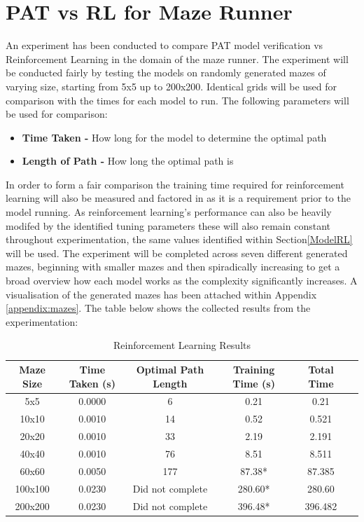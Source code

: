 \documentclass[twoside, 12pt, a4paper]{article}
\begin{document}
\section{PAT vs RL for Maze Runner}
An experiment has been conducted to compare PAT model verification vs Reinforcement Learning in the domain of the maze runner. The experiment will be conducted fairly by testing the models on randomly generated mazes of varying size, starting from 5x5 up to 200x200. Identical grids will be used for comparison with the times for each model to run. The following parameters will be used for comparison:
\begin {itemize}
\item \textbf{Time Taken -} How long for the model to determine the optimal path
\item \textbf{Length of Path -} How long the optimal path is
\end {itemize}
In order to form a fair comparison the training time required for reinforcement learning will also be measured and factored in as it is a requirement prior to the model running. As reinforcement learning's performance can also be heavily modifed by the identified tuning parameters these will also remain constant throughout experimentation, the same values identified within Section\ref{ModelRL} will be used.  The experiment will be completed across seven different generated mazes, beginning with smaller mazes and then spiradically increasing to get a broad overview how each model works as the complexity significantly increases. A visualisation of the generated mazes has been attached within Appendix \ref{appendix:mazes}.  The table below shows the collected results from the experimentation:
\begin{table}[ht]
\begin {center}
\begin{tabular}{ | c | c | c | c | c | c|}
\hline
 \textbf{Maze Size} & \textbf{ Time Taken (s)} &  \textbf{Optimal Path Length} &  \textbf{Training Time (s)} & \textbf{Total Time} \\
\hline
5x5 		& 0.0000	&6	 &0.21 & 0.21\\
10x10 	& 0.0010	&14	 &0.52 & 0.521\\
20x20 	& 0.0010	&33	 &2.19 & 2.191\\
40x40		& 0.0010	&76	 &8.51  & 8.511\\
60x60 	& 0.0050	&177	 &87.38* &87.385\\
100x100	& 0.0230	&Did not complete	 &280.60* & 280.60\\
200x200	& 0.0230	&Did not complete	 &396.48* & 396.482\\
\hline
\end {tabular}
\caption{\label{tab:table-name}Reinforcement Learning Results}
\end {center}
\end{table}
\end{document}
